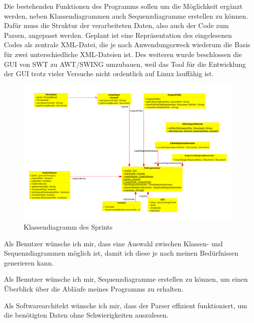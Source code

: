 Die bestehenden Funktionen des Programms sollen um die Möglichkeit ergänzt werden, neben Klassendiagrammen auch Sequenzdiagramme erstellen zu können. Dafür muss die Struktur der verarbeiteten Daten, also auch der Code zum Parsen, angepasst werden. Geplant ist eine Repräsentation des eingelesenen Codes als zentrale XML-Datei, die je nach Anwendungszweck wiederum die Basis für zwei unterschiedliche XML-Dateien ist. Des weiteren wurde beschlossen die GUI von SWT zu AWT/SWING umzubauen, weil das Tool für die Entwicklung der GUI trotz vieler Versuche nicht ordentlich auf Linux lauffähig ist.


\begin{figure}[hbtp]
\centering
\includegraphics[width=\textwidth]{Bilder/classDiagrammSprint3.png}
\caption{Klassendiagramm des Sprints}
\end{figure}




\nsecend %

Als Benutzer wünsche ich mir, dass eine Auswahl zwischen Klassen- und Sequenzdiagrammen möglich ist, damit ich diese je nach meinen Bedürfnissen generieren kann.
\nsecend

Als Benutzer wünsche ich mir, Sequenzdiagramme erstellen zu können, um einen Überblick über die Abläufe meines Programms zu erhalten.
\nsecend
\nsecend%

Als Softwarearchitekt wünsche ich mir, dass der Parser effizient funktioniert, um die benötigten Daten ohne Schwierigkeiten auszulesen.
\nsecend

